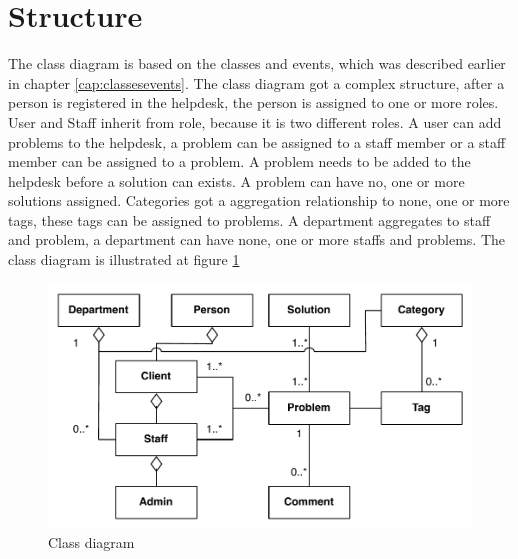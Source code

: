 \section{Structure}

The class diagram is based on the classes and events, which was described earlier in chapter \ref{cap:classesevents}. The class diagram got a complex structure, after a person is registered in the helpdesk, the person is assigned to one or more roles. User and Staff inherit from role, because it is two different roles. A user can add problems to the helpdesk, a problem can be assigned to a staff member or a staff member can be assigned to a problem. A problem needs to be added to the helpdesk before a solution can exists. A problem can have no, one or more solutions assigned. Categories got a aggregation relationship to none, one or more tags, these tags can be assigned to problems. A department aggregates to staff and problem, a department can have none, one or more staffs and problems. The class diagram is illustrated at figure \ref{fig:pdaclassdiagram}

\begin{figure}
\begin{center}
\includegraphics[scale=0.6]{input/problem_domain_analysis/newest_class_diagram.pdf}
\caption{Class diagram}
\label{fig:pdaclassdiagram}
\end{center}
\end{figure}
